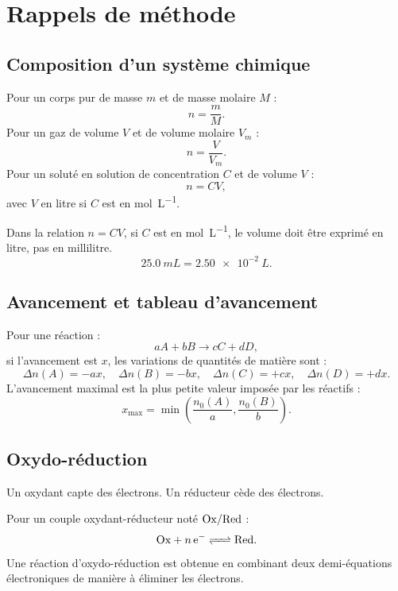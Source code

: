 \documentclass[11pt,a4paper]{article}
\begin{document}
\tableofcontents
\newpage

\section{Rappels de méthode}

\subsection{Composition d'un système chimique}

\begin{retenirbox}
Pour un corps pur de masse $m$ et de masse molaire $M$ :
\[
n=\frac{m}{M}.
\]
Pour un gaz de volume $V$ et de volume molaire $V_m$ :
\[
n=\frac{V}{V_m}.
\]
Pour un soluté en solution de concentration $C$ et de volume $V$ :
\[
n=C V,
\]
avec $V$ en litre si $C$ est en \si{mol.L^{-1}}.
\end{retenirbox}

\begin{erreurbox}
Dans la relation $n=CV$, si $C$ est en \si{mol.L^{-1}}, le volume doit être exprimé en litre, pas en millilitre.
\[
\SI{25.0}{mL}=\SI{2.50e-2}{L}.
\]
\end{erreurbox}

\subsection{Avancement et tableau d'avancement}

\begin{methodbox}
Pour une réaction :
\[
aA+bB \longrightarrow cC+dD,
\]
si l'avancement est $x$, les variations de quantités de matière sont :
\[
\Delta n(A)=-ax,\quad \Delta n(B)=-bx,\quad \Delta n(C)=+cx,\quad \Delta n(D)=+dx.
\]
L'avancement maximal est la plus petite valeur imposée par les réactifs :
\[
x_{\max}=\min\left(\frac{n_0(A)}{a},\frac{n_0(B)}{b}\right).
\]
\end{methodbox}

\subsection{Oxydo-réduction}

\begin{retenirbox}
Un oxydant capte des électrons. Un réducteur cède des électrons.

Pour un couple oxydant-réducteur noté $\ce{Ox/Red}$ :
\[
\ce{Ox + n e- <=> Red}.
\]
Une réaction d'oxydo-réduction est obtenue en combinant deux demi-équations électroniques de manière à éliminer les électrons.
\end{retenirbox}
\end{document}
